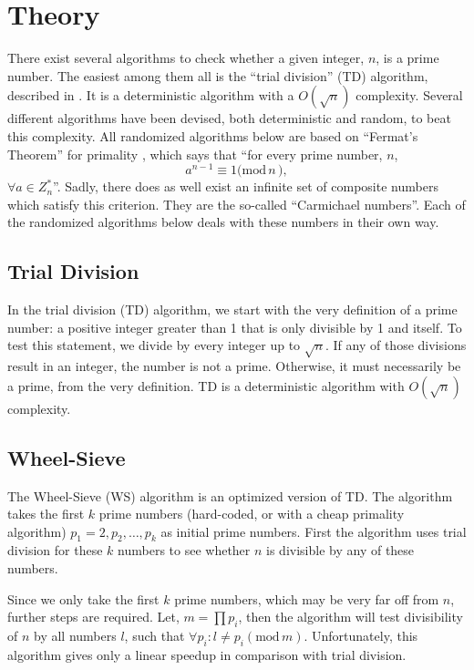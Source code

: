 \section{Theory}
There exist several algorithms to check whether a given integer, $n$, is a prime number.
The easiest among them all is the ``trial division'' (TD) algorithm, described in .
It is a deterministic algorithm with a $O(\sqrt{n})$ complexity.
Several different algorithms have been devised, both deterministic and random, to beat this complexity.
All randomized algorithms below are based on ``Fermat's Theorem'' for primality \cite{book:RA}, which says that ``for every prime number, $n$,
\begin{equation}
	a^{n-1} \equiv 1 \mathrm{(mod}\, n\, \mathrm{)},
\end{equation}
$\forall a \in Z_n^*$''.
Sadly, there does as well exist an infinite set of composite numbers which satisfy this criterion.
They are the so-called ``Carmichael numbers''.
Each of the randomized algorithms below deals with these numbers in their own way.

\subsection{Trial Division} \label{sec:TD_theory}
In the trial division (TD) algorithm, we start with the very definition of a prime number: a positive integer greater than 1 that is only divisible by 1 and itself.
To test this statement, we divide by every integer up to $\sqrt{n}$.
If any of those divisions result in an integer, the number is not a prime.
Otherwise, it must necessarily be a prime, from the very definition.
TD is a deterministic algorithm with $O(\sqrt{n})$ complexity.

\subsection{Wheel-Sieve} \label{sec:WS_theory}
The Wheel-Sieve (WS) algorithm is an optimized version of TD.
The algorithm takes the first $k$ prime numbers (hard-coded, or with a cheap primality algorithm) $p_1=2, p_2, \ldots, p_k$ as initial prime numbers.
First the algorithm uses trial division for these $k$ numbers to see whether $n$ is divisible by any of these numbers.

Since we only take the first $k$ prime numbers, which may be very far off from $n$, further steps are required.
Let, $m = \prod p_i$,
then the algorithm will test divisibility of $n$ by all numbers $l$, such that $\forall p_i: l \neq p_i (\mathrm{mod}\, m)$.
Unfortunately, this algorithm gives only a linear speedup in comparison with trial division.

